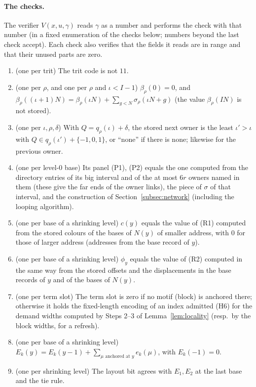 \documentclass[11pt]{article}
\theoremstyle{definition}
\theoremstyle{remark}
\begin{document}
\paragraph{The checks.} The verifier $V(x,u,\gamma)$ reads $\gamma$ as a number and performs the check with that number (in a
fixed enumeration of the checks below; numbers beyond the last check accept). Each check also verifies that the fields it reads
are in range and that their unused parts are zero.
\begin{enumerate}
\item[C1] (one per trit) The trit code is not $11$.
\item[C2] (one per $\rho$, and one per $\rho$ and $\iota<I-1$) $\beta_\rho(0)=0$, and
  $\beta_\rho((\iota+1)N)=\beta_\rho(\iota N)+\sum_{g<N}\sigma_\rho(\iota N+g)$ (the value $\beta_\rho(IN)$ is not stored).
\item[C3] (one per $\iota,\rho,\delta$) With $Q=q_\rho(\iota)+\delta$, the stored next owner is the least $\iota'>\iota$ with
  $Q\in q_\rho(\iota')+\{-1,0,1\}$, or ``none'' if there is none; likewise for the previous owner.
\item[C4] (one per level-$0$ base) Its panel (P1), (P2) equals the one computed from the directory entries of its big interval
  and of the at most $6r$ owners named in them (these give the far ends of the owner links),
  the piece of $\sigma$ of that interval, and the construction of Section~\ref{subsec:network} (including the looping algorithm).
\item[C5] (one per base of a shrinking level) $c(y)$ equals the value of (R1) computed from the stored colours of the bases of
  $N(y)$ of smaller address, with $0$ for those of larger address (addresses from the base record of $y$).
\item[C6] (one per base of a shrinking level) $\phi_y$ equals the value of (R2) computed in the same way from the stored offsets
  and the displacements in the base records of $y$ and of the bases of $N(y)$.
\item[C7] (one per term slot) The term slot is zero if no motif (block) is anchored there; otherwise it holds the fixed-length
  encoding of an index admitted (H6) for the demand widths computed by Steps 2--3 of Lemma~\ref{lem:locality} (resp.\ by the block
  widths, for a refresh).
\item[C8] (one per base of a shrinking level) $E_k(y)=E_k(y-1)+\sum_{\mu\text{ anchored at }y}e_k(\mu)$, with $E_k(-1)=0$.
\item[C9] (one per shrinking level) The layout bit agrees with $E_1,E_2$ at the last base and the tie rule.

\end{enumerate}
\end{document}
